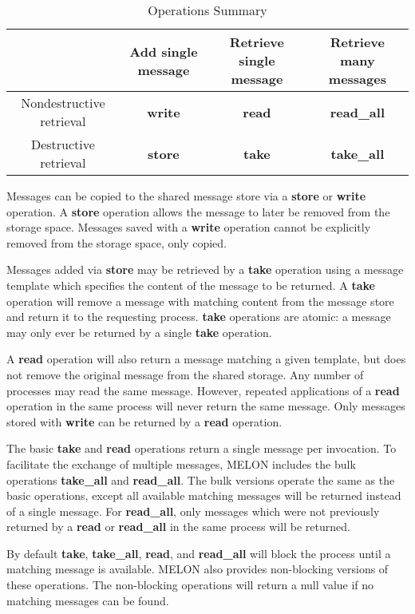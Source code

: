 \begin{table}
\centering
\caption{Operations Summary}
\begin{tabular}{|c|c|c|c|} \hline
& Add single message & Retrieve single message & Retrieve many messages \\ \hline
Nondestructive retrieval & \textbf{write} & \textbf{read} & \textbf{read\_all} \\ \hline
Destructive retrieval & \textbf{store} & \textbf{take} & \textbf{take\_all} \\ \hline
\end{tabular}
\label{table:opsummary}
\end{table}

Messages can be copied to the shared message store via a \textbf{store} or \textbf{write} operation. A \textbf{store} operation allows the message to later be removed from the storage space. Messages saved with a \textbf{write} operation cannot be explicitly removed from the storage space, only copied.

Messages added via \textbf{store} may be retrieved by a \textbf{take} operation using a message template which specifies the content of the message to be returned. A \textbf{take} operation will remove a message with matching content from the message store and return it to the requesting process. \textbf{take} operations are atomic: a message may only ever be returned by a single \textbf{take} operation.

A \textbf{read} operation will also return a message matching a given template, but does not remove the original message from the shared storage. Any number of processes may read the same message. However, repeated applications of a \textbf{read} operation in the same process will never return the same message. Only messages stored with \textbf{write} can be returned by a \textbf{read} operation.

The basic \textbf{take} and \textbf{read} operations return a single message per invocation. To facilitate the exchange of multiple messages, MELON includes the bulk operations \textbf{take\_all} and \textbf{read\_all}. The bulk versions operate the same as the basic operations, except all available matching messages will be returned instead of a single message. For \textbf{read\_all}, only messages which were not previously returned by a \textbf{read} or \textbf{read\_all} in the same process will be returned.

By default \textbf{take}, \textbf{take\_all}, \textbf{read}, and \textbf{read\_all} will block the process until a matching message is available. MELON also provides non-blocking versions of these operations. The non-blocking operations will return a null value if no matching messages can be found.

